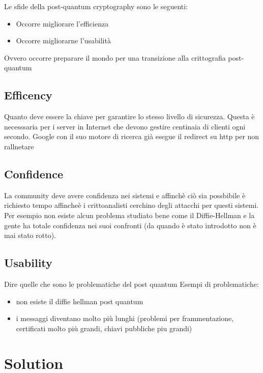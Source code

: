 Le sfide della post-quantum cryptography sono le seguenti:

\begin{itemize}
	\item Occorre migliorare l'efficienza 
	\item Occorre migliorarne l'usabilità
\end{itemize}

Ovvero occorre preparare il mondo per una transizione alla crittografia post-quantum

\subsection{Efficency}

Quanto deve essere la chiave per garantire lo stesso livello di sicurezza. Questa è necesssaria per i server in Internet che devono gestire centinaia di clienti ogni secondo.
Google con il suo motore di ricerca già esegue il redirect su http per non rallnetare

\subsection{Confidence}

La community deve avere confidenza nei sistemi e affinchè ciò sia possbibile è richiesto tempo affincheè i crittoanalisti cerchino degli attacchi per questi sistemi. 
Per esempio non esiste alcun problema studiato bene come il  Diffie-Hellman e la gente ha totale confidenza nei suoi confronti (da quando è stato introdotto non è mai stato rotto).


\subsection{Usability}



Dire quelle che sono le problematiche del post quantum
Esempi di problematiche:
\begin{itemize}
\item non esiste il diffie hellman post quantum
\item i messaggi diventano molto più lunghi (problemi per frammentazione,
	certificati molto più grandi, chiavi pubbliche piu grandi)
\end{itemize}


\section{Solution}

